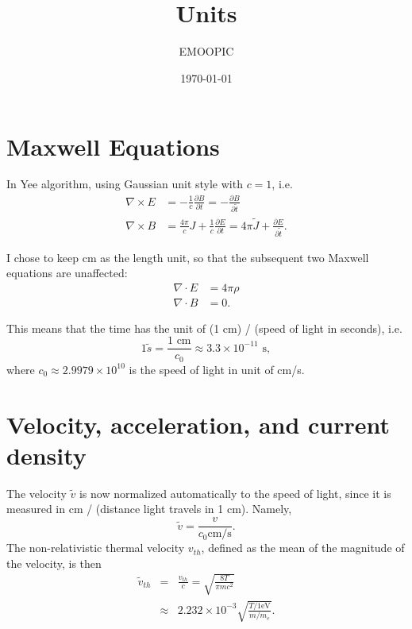 \documentclass[paper=a4, fontsize=11pt]{scrartcl} %
\title{	
\horrule{0.5pt} \\[0.2cm] %
\huge Units \\[-0.2cm] %
\horrule{2pt} %
}
\author{EMOOPIC} %
\date{\normalsize\today} %
\numberwithin{equation}{section} %
\numberwithin{figure}{section} %
\numberwithin{table}{section} %
\begin{document}
\maketitle %


\section*{Maxwell Equations}

In Yee algorithm, using Gaussian unit style with $c = 1$, i.e.
\begin{align}
	\nabla \times E &= -\frac{1}{c} \frac{\partial B}{\partial t} = -\frac{\partial B}{\partial \tilde{t}}\\
	\nabla \times B &= \frac{4 \pi}{c} J + \frac{1}{c} \frac{\partial E}{\partial t} = 4 \pi \tilde{J} + \frac{\partial E}{\partial \tilde{t}}.
\end{align}

I chose to keep cm as the length unit, so that the subsequent two Maxwell equations are unaffected:
\begin{align}
	\nabla \cdot E &= 4 \pi \rho \\
	\nabla \cdot B &= 0.
\end{align}

This means that the time has the unit of (1 cm) / (speed of light in seconds), i.e.
\begin{equation}
	1 \tilde{s} = \frac{1 \text{ cm}}{c_0} \approx 3.3 \times 10^{-11} \text{ s},
\end{equation}
where $c_0 \approx 2.9979\times 10^{10}$ is the speed of light in unit of cm/s.

\section*{Velocity, acceleration, and current density}

The velocity $\tilde{v}$ is now normalized automatically to the speed of light, since it is measured in cm / (distance light travels in 1 cm). Namely,
\begin{equation}
	\tilde{v}=\frac{v}{c_0 \text{cm/s}}.
\end{equation}
The non-relativistic thermal velocity $v_{th}$, defined as the mean of the magnitude of the velocity, is then
\begin{eqnarray}
	\tilde{v}_{th}&=&\frac{v_{th}}{c}=\sqrt{\frac{8T}{\pi mc^2}}\\
         &\approx&2.232\times 10^{-3}\sqrt{\frac{T/1 \text{eV}}{m/m_e}}.
\end{eqnarray}
\end{document}
